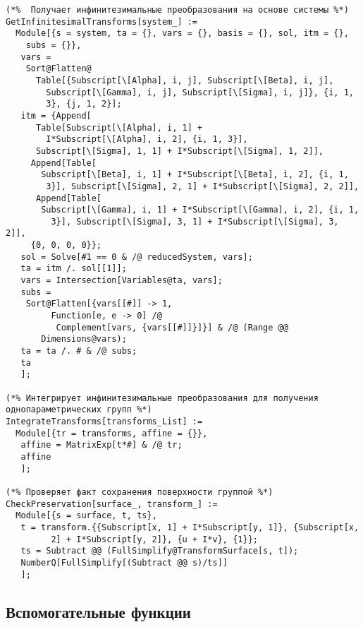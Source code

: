 \documentclass[../main.tex]{subfiles}
\begin{document}
\begin{lstlisting}
(*%  Получает инфинитезимальные преобразования на основе системы %*)
GetInfinitesimalTransforms[system_] :=
  Module[{s = system, ta = {}, vars = {}, basis = {}, sol, itm = {},
    subs = {}},
   vars =
    Sort@Flatten@
      Table[{Subscript[\[Alpha], i, j], Subscript[\[Beta], i, j],
        Subscript[\[Gamma], i, j], Subscript[\[Sigma], i, j]}, {i, 1,
        3}, {j, 1, 2}];
   itm = {Append[
      Table[Subscript[\[Alpha], i, 1] +
        I*Subscript[\[Alpha], i, 2], {i, 1, 3}],
      Subscript[\[Sigma], 1, 1] + I*Subscript[\[Sigma], 1, 2]],
     Append[Table[
       Subscript[\[Beta], i, 1] + I*Subscript[\[Beta], i, 2], {i, 1,
        3}], Subscript[\[Sigma], 2, 1] + I*Subscript[\[Sigma], 2, 2]],
      Append[Table[
       Subscript[\[Gamma], i, 1] + I*Subscript[\[Gamma], i, 2], {i, 1,
         3}], Subscript[\[Sigma], 3, 1] + I*Subscript[\[Sigma], 3, 2]],
     {0, 0, 0, 0}};
   sol = Solve[#1 == 0 & /@ reducedSystem, vars];
   ta = itm /. sol[[1]];
   vars = Intersection[Variables@ta, vars];
   subs =
    Sort@Flatten[{vars[[#]] -> 1,
         Function[e, e -> 0] /@
          Complement[vars, {vars[[#]]}]}] & /@ (Range @@
       Dimensions@vars);
   ta = ta /. # & /@ subs;
   ta
   ];

(*% Интегрирует инфинитезимальные преобразования для получения однопараметрических групп %*)
IntegrateTransforms[transforms_List] :=
  Module[{tr = transforms, affine = {}},
   affine = MatrixExp[t*#] & /@ tr;
   affine
   ];

(*% Проверяет факт сохранения поверхности группой %*)
CheckPreservation[surface_, transform_] :=
  Module[{s = surface, t, ts},
   t = transform.{{Subscript[x, 1] + I*Subscript[y, 1]}, {Subscript[x,
         2] + I*Subscript[y, 2]}, {u + I*v}, {1}};
   ts = Subtract @@ (FullSimplify@TransformSurface[s, t]);
   NumberQ[FullSimplify[(Subtract @@ s)/ts]]
   ];
\end{lstlisting}

\subsection{Вспомогательные функции}
\end{document}
